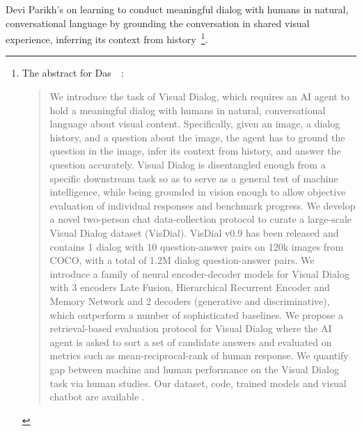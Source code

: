 Devi Parikh's {} on learning to conduct meaningful dialog with humans in natural, conversational language by grounding the conversation in shared visual experience, inferring its context from history~\cite{DasetalCVPR-17}\footnote{%
%
  The abstract for Das~\etal{}~\cite{DasetalCVPR-17}:
%
  \begin{quotation}
%
    We introduce the task of Visual Dialog, which requires an AI agent to hold a meaningful dialog with humans in natural, conversational language about visual content. Specifically, given an image, a dialog history, and a question about the image, the agent has to ground the question in the image, infer its context from history, and answer the question accurately. Visual Dialog is disentangled enough from a specific downstream task so as to serve as a general test of machine intelligence, while being grounded in vision enough to allow objective evaluation of individual responses and benchmark progress. We develop a novel two-person chat data-collection protocol to curate a large-scale Visual Dialog dataset (VisDial). VisDial v0.9 has been released and contains 1 dialog with 10 question-answer pairs on \hmapprox{}120k images from COCO, with a total of \hmapprox{}1.2M dialog question-answer pairs. We introduce a family of neural encoder-decoder models for Visual Dialog with 3 encoders \emdash{} Late Fusion, Hierarchical Recurrent Encoder and Memory Network \emdash{} and 2 decoders (generative and discriminative), which outperform a number of sophisticated baselines. We propose a retrieval-based evaluation protocol for Visual Dialog where the AI agent is asked to sort a set of candidate answers and evaluated on metrics such as mean-reciprocal-rank of human response. We quantify gap between machine and human performance on the Visual Dialog task via human studies. Our dataset, code, trained models and visual chatbot are available {}.
%
  \end{quotation}}.

